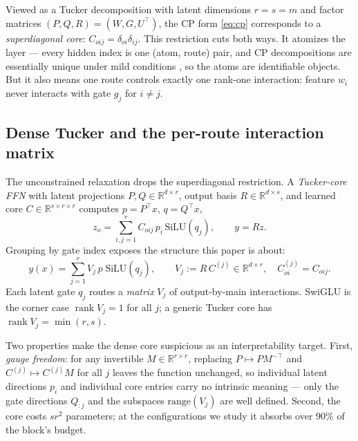 \documentclass[11pt]{article}
\newcommand{\R}{\mathbb{R}}
\newcommand{\silu}{\mathrm{SiLU}}
\newcommand{\T}{^{\top}}
\DeclareMathOperator{\rank}{rank}
\begin{document}
Viewed as a Tucker decomposition with latent dimensions $r=s=m$ and factor matrices
$(P,Q,R) = (W, G, U\T)$, the CP form \eqref{eq:cp} corresponds to a
\emph{superdiagonal core}: $C_{oij} = \delta_{oi}\delta_{ij}$. This restriction cuts
both ways. It atomizes the layer --- every hidden index is one (atom, route) pair, and
CP decompositions are essentially unique under mild conditions
\citep{kruskal1977three}, so the atoms are identifiable objects. But it also means one
route controls exactly one rank-one interaction: feature $w_i$ never interacts with
gate $g_j$ for $i \ne j$.

\subsection{Dense Tucker and the per-route interaction matrix}
\label{sec:tucker}

The unconstrained relaxation drops the superdiagonal restriction. A
\emph{Tucker-core FFN} with latent projections $P, Q \in \R^{d\times r}$, output basis
$R \in \R^{d \times s}$, and learned core $C \in \R^{s\times r\times r}$ computes
$p = P\T x$, $q = Q\T x$,
\begin{equation}
\label{eq:tuckerffn}
z_o = \sum_{i,j=1}^{r} C_{oij}\, p_i\, \silu(q_j), \qquad y = Rz .
\end{equation}
Grouping by gate index exposes the structure this paper is about:
\begin{equation}
\label{eq:vj}
y(x) = \sum_{j=1}^{r} V_j\, p \; \silu(q_j), \qquad V_j := R\,C^{(j)} \in \R^{d\times r},
\quad C^{(j)}_{oi} = C_{oij}.
\end{equation}
Each latent gate $q_j$ routes a \emph{matrix} $V_j$ of output-by-main interactions.
SwiGLU is the corner case $\rank V_j = 1$ for all $j$; a generic Tucker core has
$\rank V_j = \min(r,s)$.

Two properties make the dense core suspicious as an interpretability target. First,
\emph{gauge freedom}: for any invertible $M \in \R^{r\times r}$, replacing $P \mapsto
P M^{-\top}$ and $C^{(j)} \mapsto C^{(j)} M$ for all $j$ leaves the function
unchanged, so individual latent directions $p_i$ and individual core entries carry no
intrinsic meaning --- only the gate directions $Q_{:j}$ and the subspaces
$\mathrm{range}(V_j)$ are well defined. Second, the core costs $s r^2$ parameters; at
the configurations we study it absorbs over $90\%$ of the block's budget.
\end{document}
